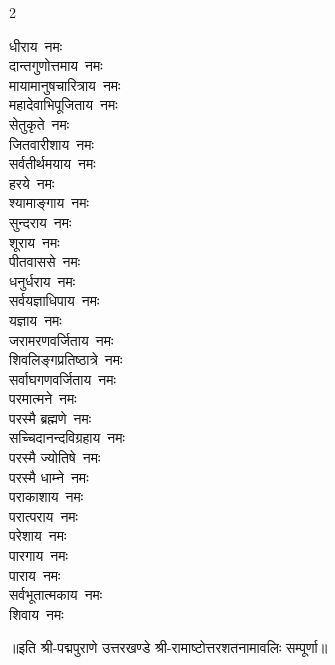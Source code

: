 \begin{multicols}{2}
\begin{flushleft}
धीराय~नमः\\
दान्तगुणोत्तमाय~नमः\\
मायामानुषचारित्राय~नमः\\
महादेवाभिपूजिताय~नमः\\
सेतुकृते~नमः\\
जितवारीशाय~नमः\\
सर्वतीर्थमयाय~नमः\hfill{}\\
हरये~नमः\\
श्यामाङ्गाय~नमः\\
सुन्दराय~नमः\\
शूराय~नमः\\
पीतवाससे~नमः\\
धनुर्धराय~नमः\\
सर्वयज्ञाधिपाय~नमः\\
यज्ञाय~नमः\\
जरामरणवर्जिताय~नमः\\
शिवलिङ्गप्रतिष्ठात्रे~नमः\hfill{}\\
सर्वाघगणवर्जिताय~नमः\\
परमात्मने~नमः\\
परस्मै ब्रह्मणे~नमः\\
सच्चिदानन्दविग्रहाय~नमः\\
परस्मै ज्योतिषे~नमः\\
परस्मै धाम्ने~नमः\\
पराकाशाय~नमः\\
परात्पराय~नमः\\
परेशाय~नमः\\
पारगाय~नमः\\
पाराय~नमः\\
सर्वभूतात्मकाय~नमः\\
शिवाय~नमः\\
\end{flushleft}
\end{multicols}
॥इति श्री-पद्मपुराणे उत्तरखण्डे श्री-रामाष्टोत्तरशतनामावलिः सम्पूर्णा॥
